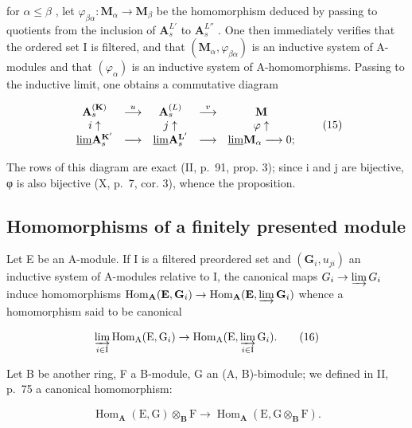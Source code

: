 for \(\alpha \leqslant \beta\) , let \(\varphi_{\beta \alpha}: \mathbf{M}_{\alpha} \to \mathbf{M}_{\beta}\) be the homomorphism deduced by passing to quotients from the inclusion of \(\mathbf{A}_s^{L'}\) to \(\mathbf{A}_s^{L''}\) . One then immediately verifies that the ordered set I is filtered, and that \((\mathbf{M}_{\alpha}, \varphi_{\beta \alpha})\) is an inductive system of A-modules and that \((\varphi_{\alpha})\) is an inductive system of A-homomorphisms. Passing to the inductive limit, one obtains a commutative diagram

\[
\begin{array}{c c c c c} \mathbf {A} _ {s} ^ {(\mathbf {K})} & \stackrel {{u}} {{\longrightarrow}} & \mathbf {A} _ {s} ^ {(L)} & \stackrel {{v}} {{\longrightarrow}} & \mathbf {M} \\ i \uparrow & & j \uparrow & & \varphi \uparrow \\ \underline {{\lim}} \mathbf {A} _ {s} ^ {\mathbf {K} ^ {\prime}} & \longrightarrow & \underline {{\lim}} \mathbf {A} _ {s} ^ {\mathbf {L} ^ {\prime}} & \longrightarrow & \underline {{\lim}} \mathbf {M} _ {\alpha} \longrightarrow 0; \end{array}\tag{15}
\]

The rows of this diagram are exact (II, p.~91, prop. 3); since i and j are bijective, φ is also bijective (X, p.~7, cor. 3), whence the proposition.

\subsection{Homomorphisms of a finitely presented module}

Let E be an A-module. If I is a filtered preordered set and \((\mathbf{G}_{i}, u_{ji})\) an inductive system of A-modules relative to I, the canonical maps \(G_{i} \to \varinjlim G_{i}\) induce homomorphisms \(\operatorname{Hom}_{\mathbf{A}}(\mathbf{E}, \mathbf{G}_{i}) \to \operatorname{Hom}_{\mathbf{A}}(\mathbf{E}, \varinjlim \mathbf{G}_{i})\) whence a homomorphism said to be canonical

\[
\varinjlim_ {i \in \mathrm{I}} \operatorname{Hom} _ {\mathrm{A}} (\mathrm{E}, \mathrm{G} _ {i}) \rightarrow \operatorname{Hom} _ {\mathrm{A}} (\mathrm{E}, \varinjlim_ {i \in \mathrm{I}} \mathrm{G} _ {i}).\tag{16}
\]

Let B be another ring, F a B-module, G an (A, B)-bimodule; we defined in II, p.~75 a canonical homomorphism:

\[
\operatorname{Hom} _ {\mathbf {A}} (\mathrm{E}, \mathrm{G}) \otimes_ {\mathbf {B}} \mathrm{F} \rightarrow \operatorname{Hom} _ {\mathbf {A}} (\mathrm{E}, \mathrm{G} \otimes_ {\mathbf {B}} \mathrm{F}).\tag{17}
\]

